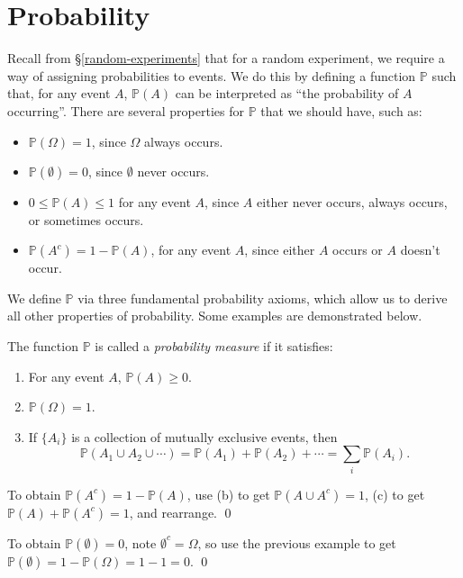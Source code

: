 \section{Probability}
Recall from \S\ref{random-experiments} that for a random experiment, we require a way of assigning probabilities to events. We do this by defining a function $\mathbb{P}$ such that, for any event $A$, $\mathbb{P}(A)$ can be interpreted as ``the probability of $A$ occurring''. There are several properties for $\mathbb{P}$ that we should have, such as:
\begin{itemize}
    \item $\mathbb{P}(\Omega) = 1$, since $\Omega$ always occurs.
    \item $\mathbb{P}(\emptyset) = 0$, since $\emptyset$ never occurs.
    \item $0 \leq \mathbb{P}(A) \leq 1$ for any event $A$, since $A$ either never occurs, always occurs, or sometimes occurs.
    \item $\mathbb{P}(A^c) = 1 - \mathbb{P}(A)$, for any event $A$, since either $A$ occurs or $A$ doesn't occur.
\end{itemize}

We define $\mathbb{P}$ via three fundamental probability axioms, which allow us to derive all other properties of probability. Some examples are demonstrated below.

\begin{definition}
    The function $\mathbb{P}$ is called a \emph{probability measure} if it satisfies:
    \begin{enumerate}[label=(\alph*)]
        \item For any event $A$, $\mathbb{P}(A) \geq 0$.
        \item $\mathbb{P}(\Omega) = 1$.
        \item If $\{A_i\}$ is a collection of mutually exclusive events, then
        \[
            \mathbb{P}(A_1 \cup A_2 \cup \cdots) = \mathbb{P}(A_1) + \mathbb{P}(A_2) + \cdots = \sum_{i} \mathbb{P}(A_i)
        .\]
    \end{enumerate}
\end{definition}

\begin{example}
    To obtain $\mathbb{P}(A^c) = 1 - \mathbb{P}(A)$, use (b) to get $\mathbb{P}(A \cup A^c) = 1$, (c) to get $\mathbb{P}(A) + \mathbb{P}(A^c) = 1$, and rearrange. \qed
\end{example}

\begin{example}
    To obtain $\mathbb{P}(\emptyset) = 0$, note $\emptyset^c = \Omega$, so use the previous example to get $\mathbb{P}(\emptyset) = 1 - \mathbb{P}(\Omega) = 1 - 1 = 0$. \qed
\end{example}

